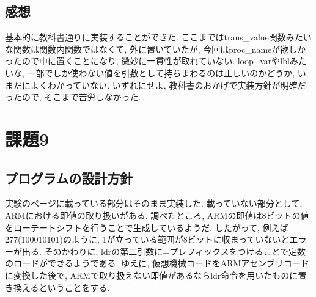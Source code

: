 \documentclass{jarticle}
\begin{document}
\subsection{感想}
基本的に教科書通りに実装することができた. ここまではtrans\_value関数みたいな関数は関数内関数ではなくて, 外に置いていたが, 今回はproc\_nameが欲しかったので中に置くことになり, 微妙に一貫性が取れていない. loop\_varやlblみたいな, 一部でしか使わない値を引数として持ちまわるのは正しいのかどうか, いまだによくわかっていない. いずれにせよ, 教科書のおかげで実装方針が明確だったので, そこまで苦労しなかった.


\section{課題9}
\subsection{プログラムの設計方針}
実験のページに載っている部分はそのまま実装した. 載っていない部分として, ARMにおける即値の取り扱いがある. 調べたところ, ARMの即値は8ビットの値をローテートシフトを行うことで生成しているようだ. したがって, 例えば277(100010101)のように, 1が立っている範囲が8ビットに収まっていないとエラーが出る. そのかわりに, ldrの第二引数に=プレフィックスをつけることで定数のロードができるようである. ゆえに, 仮想機械コードをARMアセンブリコードに変換した後で, ARMで取り扱えない即値があるならldr命令を用いたものに置き換えるということをする.
\end{document}
